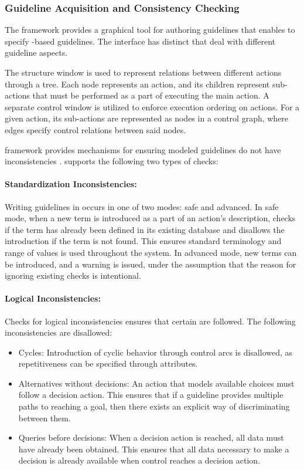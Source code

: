 \subsubsection{Guideline Acquisition and Consistency Checking}

The \GLARE{} framework provides a graphical tool for authoring guidelines
that enables \HCPs{} to specify \GLARE{}-based guidelines.
The interface has distinct  that deal with different guideline
aspects.

The structure window is used to represent relations
between different actions through a tree. Each node represents
an action, and its children represent sub-actions that must be performed
as a part of executing the main action.
A separate control window is utilized to enforce execution
ordering on actions. For a given action, its sub-actions
are represented as nodes in a control graph, where edges
specify control relations between said nodes.

\GLARE{} framework provides mechanisms for ensuring modeled
guidelines do not have inconsistencies \cite{TerenzianiAIM01}. \GLARE{} supports the
following two types of checks:

\paragraph{Standardization Inconsistencies:}

Writing guidelines in \GLARE{} occurs in one of two modes: safe and
advanced. In safe mode, when a new term is introduced as a part of
an action's description, \GLARE{} checks if the term has already been
defined in its existing database and disallows the introduction if
the term is not found. This ensures standard terminology and range of values
is used throughout the system. In advanced mode, new terms can be introduced,
and a warning is issued, under the assumption that the reason for ignoring
existing checks is intentional.

\paragraph{Logical Inconsistencies:}

Checks for logical inconsistencies ensures that certain  are followed. The following inconsistencies are disallowed:

\begin{itemize}
  \item Cycles: Introduction of cyclic behavior through control arcs is
    disallowed, as repetitiveness can be specified through attributes.
  \item Alternatives without decisions: An action that models available choices
    must follow a decision action. This ensures that if a guideline provides
    multiple paths to reaching a goal, then there exists an explicit way of
    discriminating between them.
  \item Queries before decisions: When a decision action is reached, all
    data must have already been obtained. This ensures that all data
    necessary to make a decision is already available when control reaches
    a decision action.
\end{itemize}

